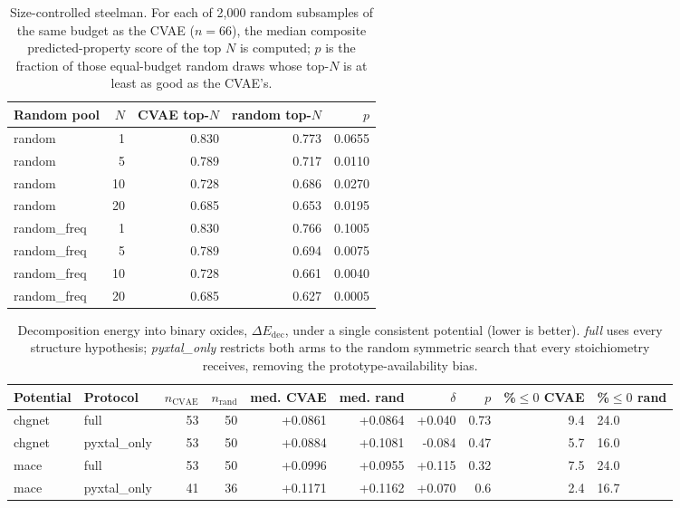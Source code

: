 \begin{table}[t]
\centering
\small
\caption{Size-controlled steelman. For each of 2{,}000 random subsamples of the same budget as the CVAE ($n=66$), the median composite predicted-property score of the top $N$ is computed; $p$ is the fraction of those equal-budget random draws whose top-$N$ is at least as good as the CVAE's.}
\label{tab:a7_steelman}
\begin{tabular}{lrrrr}
\toprule
Random pool & $N$ & CVAE top-$N$ & random top-$N$ & $p$ \\
\midrule
random & 1 & 0.830 & 0.773 & 0.0655 \\
random & 5 & 0.789 & 0.717 & 0.0110 \\
random & 10 & 0.728 & 0.686 & 0.0270 \\
random & 20 & 0.685 & 0.653 & 0.0195 \\
random\_freq & 1 & 0.830 & 0.766 & 0.1005 \\
random\_freq & 5 & 0.789 & 0.694 & 0.0075 \\
random\_freq & 10 & 0.728 & 0.661 & 0.0040 \\
random\_freq & 20 & 0.685 & 0.627 & 0.0005 \\
\bottomrule
\end{tabular}
\end{table}

\begin{table}[t]
\centering
\small
\caption{Decomposition energy into binary oxides, $\Delta E_{\mathrm{dec}}$, under a single consistent potential (lower is better). \emph{full} uses every structure hypothesis; \emph{pyxtal\_only} restricts both arms to the random symmetric search that every stoichiometry receives, removing the prototype-availability bias.}
\label{tab:a7_energetics}
\begin{tabular}{llrrrrrrrl}
\toprule
Potential & Protocol & $n_{\mathrm{CVAE}}$ & $n_{\mathrm{rand}}$ & med. CVAE & med. rand & $\delta$ & $p$ & \%$\le 0$ CVAE & \%$\le 0$ rand \\
\midrule
chgnet & full & 53 & 50 & +0.0861 & +0.0864 & +0.040 & 0.73 & 9.4 & 24.0 \\
chgnet & pyxtal\_only & 53 & 50 & +0.0884 & +0.1081 & -0.084 & 0.47 & 5.7 & 16.0 \\
mace & full & 53 & 50 & +0.0996 & +0.0955 & +0.115 & 0.32 & 7.5 & 24.0 \\
mace & pyxtal\_only & 41 & 36 & +0.1171 & +0.1162 & +0.070 & 0.6 & 2.4 & 16.7 \\
\bottomrule
\end{tabular}
\end{table}
